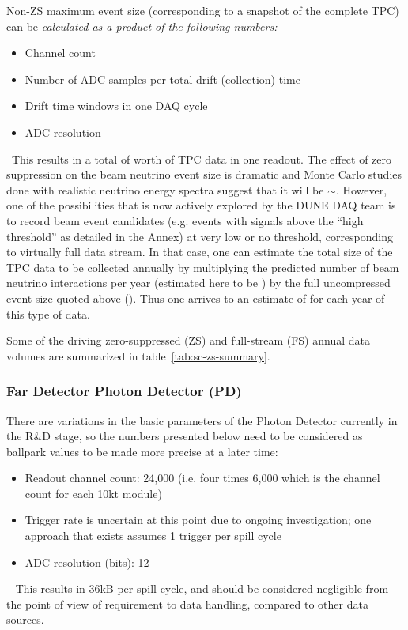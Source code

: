 Non-ZS maximum event size (corresponding to a snapshot of the complete TPC) can be \textit{calculated as a product of the following numbers:}
\begin{itemize}
\item Channel count
\item Number of ADC samples per total drift (collection) time
\item Drift time windows in one DAQ cycle
\item ADC resolution
\end{itemize}
\
This results in a total of \dunefsreadoutsize worth of TPC data in one readout.
The effect of zero suppression on
the beam neutrino event size is dramatic and Monte Carlo studies done with realistic neutrino
energy spectra suggest that it will be $\sim$\beameventsize.
However, one of the possibilities that is
now actively explored by the DUNE DAQ team is to record beam event candidates (e.g. events with signals
above the ``high threshold'' as detailed in the Annex) at very low or no threshold, corresponding
to virtually full data stream.
In that case, one can estimate the total size of the TPC data
to be collected annually by multiplying the predicted number of beam neutrino interactions
per year (estimated here to be \beamrate) by the full uncompressed event size quoted above (\dunefsreadoutsize). 
Thus one arrives to an estimate of \beamdatayearfs for each year of this type of
data.

Some of the driving zero-suppressed (ZS) and full-stream (FS) annual
data volumes are summarized in table~\ref{tab:sc-zs-summary}.




\subsubsection{Far Detector Photon Detector (PD)}
There are variations in the basic parameters of the Photon Detector currently in the R\&D stage,
so the numbers presented below need to be considered as ballpark values to be made more precise
at a later time:

\begin{itemize}
\item Readout channel count: 24,000 (i.e. four times 6,000 which is the channel count for each 10kt module)
\item Trigger rate is uncertain at this point due to ongoing investigation; one approach that exists assumes 1 trigger per spill cycle
\item ADC resolution (bits): 12
\end{itemize}
\
This results in 36kB per spill cycle, and should be considered negligible from the point of view of requirement to data handling, compared to other data sources.

